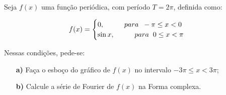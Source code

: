 \linespread{1.5}
Seja $f(x)$ uma função periódica, com período $T = 2\pi$, definida como:

\begin{equation*}
    f(x) = \begin{cases}
    0, \hspace{1cm} para \hspace{0.2cm} -\pi \leq x < 0\\
    \sin{x}, \hspace{1cm} para \hspace{0.2cm} 0 \leq x < \pi
    \end{cases}\,
\end{equation*}

Nessas condições, pede-se:
\begin{itemize}
    \item[\textbf{a)}] Faça o esboço do gráfico de $f(x)$ no intervalo $-3\pi \leq x < 3\pi$;
    \item[\textbf{b)}]Calcule a série de Fourier de $f(x)$ na Forma complexa.
\end{itemize}